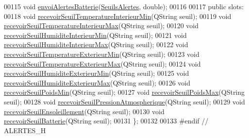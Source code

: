 \begin{DoxyCode}
00115         \textcolor{keywordtype}{void} \hyperlink{class_alertes_a0e81d795f8e7559eab19fcb9be138f5f}{envoiAlertesBatterie}(\hyperlink{parametres_8h_aaa6de8207c94675264c90b10b613368d}{SeuilsAlertes}, \textcolor{keywordtype}{double});
00116 
00117     \textcolor{keyword}{public} slots:
00118         \textcolor{keywordtype}{void} \hyperlink{class_alertes_a0e5e5177eed435d74bcbdc2a36911e52}{recevoirSeuilTemperatureInterieurMin}(QString seuil);
00119         \textcolor{keywordtype}{void} \hyperlink{class_alertes_a06b136f1e86ca97978187305a11be0ff}{recevoirSeuilTemperatureInterieurMax}(QString seuil);
00120         \textcolor{keywordtype}{void} \hyperlink{class_alertes_a4444f527a708f8e1963d2dc1c95bad96}{recevoirSeuilHumiditeInterieurMin}(QString seuil);
00121         \textcolor{keywordtype}{void} \hyperlink{class_alertes_a7554e8b6752b0e0a5cfefeecfbc3ba56}{recevoirSeuilHumiditeInterieurMax}(QString seuil);
00122         \textcolor{keywordtype}{void} \hyperlink{class_alertes_ad88c760d06e1d438a57027857d50a77f}{recevoirSeuilTemperatureExterieurMin}(QString seuil);
00123         \textcolor{keywordtype}{void} \hyperlink{class_alertes_af896e03da2f2ec319d410fb8dcc89e0e}{recevoirSeuilTemperatureExterieurMax}(QString seuil);
00124         \textcolor{keywordtype}{void} \hyperlink{class_alertes_a021d167be6c98d9b0718bb9c7209b47e}{recevoirSeuilHumiditeExterieurMin}(QString seuil);
00125         \textcolor{keywordtype}{void} \hyperlink{class_alertes_a8c8500d99314034be3c01a871f209fb8}{recevoirSeuilHumiditeExterieurMax}(QString seuil);
00126         \textcolor{keywordtype}{void} \hyperlink{class_alertes_ab6a15b0c8387a2cdf47dacce92c60383}{recevoirSeuilPoidsMin}(QString seuil);
00127         \textcolor{keywordtype}{void} \hyperlink{class_alertes_a77b71a5bc047ced8d09f59a521f58616}{recevoirSeuilPoidsMax}(QString seuil);
00128         \textcolor{keywordtype}{void} \hyperlink{class_alertes_a4496c251e1cde3e8c6beee64bad53fe3}{recevoirSeuilPressionAtmospherique}(QString seuil);
00129         \textcolor{keywordtype}{void} \hyperlink{class_alertes_abf6b9934820f50024c50dc9691f4ddee}{recevoirSeuilEnsoleillement}(QString seuil);
00130         \textcolor{keywordtype}{void} \hyperlink{class_alertes_a61e1f4a105bd64ac829959726ae6ebb8}{recevoirSeuilBatterie}(QString seuil);
00131 \};
00132 
00133 \textcolor{preprocessor}{#endif // ALERTES\_H}
\end{DoxyCode}
